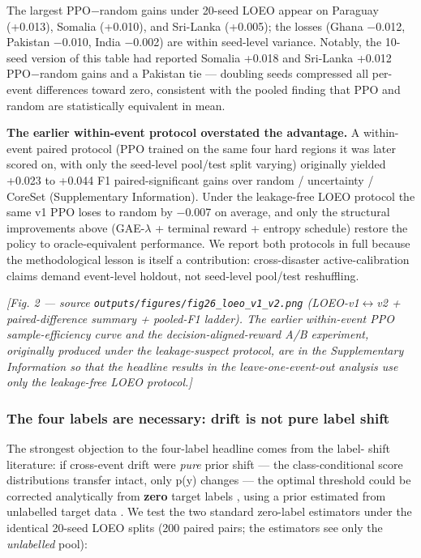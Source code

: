 The largest PPO$-$random gains under 20-seed LOEO appear on Paraguay
(+0.013), Somalia (+0.010), and Sri-Lanka (+0.005); the losses (Ghana
$-$0.012, Pakistan $-$0.010, India $-$0.002) are within seed-level variance.
Notably, the 10-seed version of this table had reported Somalia +0.018
and Sri-Lanka +0.012 PPO$-$random gains and a Pakistan tie --- doubling
seeds compressed all per-event differences toward zero, consistent with
the pooled finding that PPO and random are statistically equivalent
in mean.

\textbf{The earlier within-event protocol overstated the advantage.} A within-
event paired protocol (PPO trained on the same four hard regions it was
later scored on, with only the seed-level pool/test split varying)
originally yielded
+0.023 to +0.044 F1 paired-significant gains over random / uncertainty /
CoreSet (Supplementary Information). Under the leakage-free LOEO protocol the same
v1 PPO loses to random by $-$0.007 on average, and only the structural
improvements above (GAE-$\lambda$ + terminal reward + entropy schedule) restore the
policy to oracle-equivalent performance. We report both protocols in full
because the methodological lesson is itself a contribution: cross-disaster
active-calibration claims demand event-level holdout, not seed-level
pool/test reshuffling.

\emph{{[}Fig. 2 --- source \texttt{outputs/figures/fig26\_loeo\_v1\_v2.png} (LOEO-v1$\leftrightarrow$v2 +
paired-difference summary + pooled-F1 ladder). The earlier within-event
PPO sample-efficiency curve and the decision-aligned-reward A/B
experiment, originally produced under the leakage-suspect protocol, are
in the Supplementary Information so that the headline results in the leave-one-event-out analysis use
only the leakage-free LOEO protocol.{]}}

\subsubsection{The four labels are necessary: drift is not pure label shift}\label{the-four-labels-are-necessary-drift-is-not-pure-label-shift}

The strongest objection to the four-label headline comes from the label-
shift literature: if cross-event drift were \emph{pure} prior shift --- the
class-conditional score distributions transfer intact, only p(y)
changes --- the optimal threshold could be corrected analytically from
\textbf{zero} target labels \cite{elkan2001foundations}, using a prior estimated from
unlabelled target data \cite{saerens2002adjusting,lipton2018detecting}. We test the two
standard zero-label estimators under the identical 20-seed LOEO splits
(200 paired pairs; the estimators see only the \emph{unlabelled} pool):

